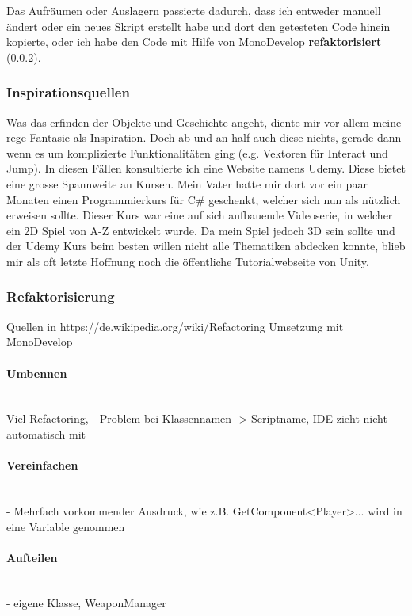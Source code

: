 Das Aufräumen oder Auslagern passierte dadurch, dass ich entweder manuell ändert oder ein neues Skript erstellt habe und dort den getesteten Code hinein kopierte, oder ich habe den Code mit Hilfe von MonoDevelop \textbf{refaktorisiert} (\cref{subsubsec:refactoring}). 

\subsubsection{Inspirationsquellen}
Was das erfinden der Objekte und Geschichte angeht, diente mir vor allem meine rege Fantasie als Inspiration.
Doch ab und an half auch diese nichts, gerade dann wenn es um komplizierte Funktionalitäten 
ging (e.g. Vektoren für Interact und Jump).
In diesen Fällen konsultierte ich eine Website namens Udemy. Diese bietet eine grosse Spannweite an Kursen. Mein Vater hatte mir dort vor ein paar Monaten einen Programmierkurs für C\# geschenkt, welcher sich nun als nützlich erweisen sollte.
Dieser Kurs war eine auf sich aufbauende Videoserie, in welcher ein 2D Spiel von A-Z entwickelt wurde.
Da mein Spiel jedoch 3D sein sollte und der Udemy Kurs beim besten willen nicht alle Thematiken abdecken konnte, blieb mir als oft letzte Hoffnung noch die öffentliche Tutorialwebseite von Unity. \cite{unity3dtutorial}

\subsubsection{Refaktorisierung}
\label{subsubsec:refactoring}
Quellen in https://de.wikipedia.org/wiki/Refactoring
Umsetzung mit MonoDevelop
\paragraph{Umbennen}\mbox{} \\
Viel Refactoring, 
- Problem bei Klassennamen -> Scriptname, IDE zieht nicht automatisch mit

\paragraph{Vereinfachen}\mbox{} \\
- Mehrfach vorkommender Ausdruck, wie z.B. GetComponent<Player>... wird in eine Variable genommen

\paragraph{Aufteilen}\mbox{} \\
- eigene Klasse, WeaponManager

